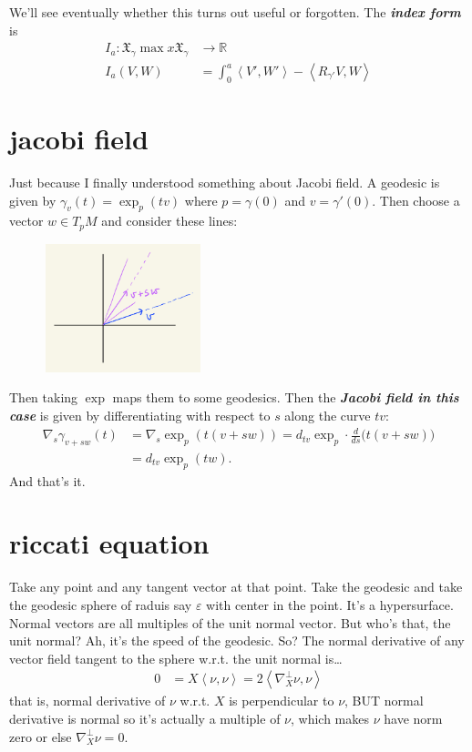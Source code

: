 We'll see eventually whether this turns out useful or forgotten. The \textit{\textbf{index form}} is
 \begin{align*}
	I_a: \mathfrak{X}_\gamma\operatorname{max}x \mathfrak{X}_\gamma &\longrightarrow \mathbb{R} \\
	I_a(V,W) &=\int_0^a \left<V',W'\right>-\left<R_{\gamma'}V,W\right>
\end{align*}


\section{jacobi field}

Just because I finally understood something about Jacobi field. A geodesic is given by \(\gamma_v(t)=\operatorname{exp}_p(tv)\) where \(p=\gamma(0)\) and \(v=\gamma'(0)\). Then choose a vector \(w \in T_pM\) and consider these lines:
\begin{figure}[H]
	\centering
	\includegraphics[width=0.4\textwidth]{fig2}
\end{figure}
Then taking \(\operatorname{exp}\) maps them to some geodesics. Then the \textit{\textbf{Jacobi field in this case}} is given by differentiating with respect to \(s\) along the curve \(tv\):
\begin{align*}\nabla_s \gamma_{v+sw}(t)&=\nabla_s \operatorname{exp}_p(t(v+sw))=d_{tv}\operatorname{exp}_p\cdot \frac{d}{ds}\Big(t(v+sw)\Big)\\&=d_{tv}\operatorname{exp}_p(tw).\end{align*}
And that's it.

\section{riccati equation}

Take any point and any tangent vector at that point. Take the geodesic and take the geodesic sphere of raduis say \(\varepsilon\) with center in the point. It's a hypersurface. Normal vectors are all multiples of the unit normal vector. But who's that, the unit normal? Ah, it's the speed of the geodesic. So? The normal derivative of any vector field tangent to the sphere w.r.t. the unit normal is…
\begin{align*}
0&=X\left<\nu,\nu\right>=2\left<\nabla^\perp_X \nu,\nu\right>
\end{align*}
that is, normal derivative of \(\nu\) w.r.t. \(X\) is perpendicular to \(\nu\), BUT normal derivative is normal so it's actually a multiple of \(\nu\), which makes \(\nu\) have norm zero or else \(\nabla^\perp_X \nu=0\).

